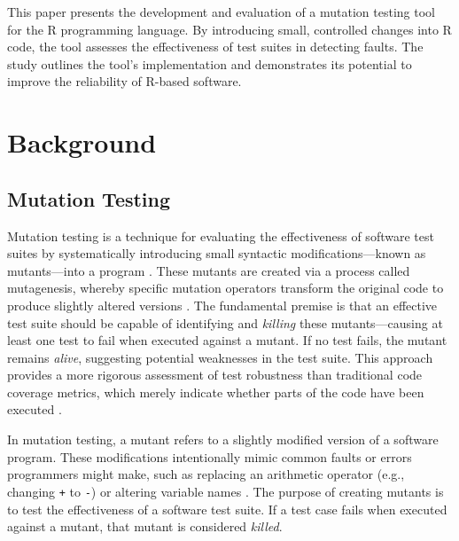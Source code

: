 This paper presents the development and evaluation of a mutation testing tool for the R programming language. By introducing small, controlled changes into R code, the tool assesses the effectiveness of test suites in detecting faults. The study outlines the tool’s implementation and demonstrates its potential to improve the reliability of R-based software.

\chapter{Background}

\begin{chapterabstract}
\end{chapterabstract}

\section{Mutation Testing}

Mutation testing is a technique for evaluating the effectiveness of software test suites by systematically introducing small syntactic modifications—known as mutants—into a program \cite{jia2011analysis}. These mutants are created via a process called mutagenesis, whereby specific mutation operators transform the original code to produce slightly altered versions \cite{offutt1996practical}. The fundamental premise is that an effective test suite should be capable of identifying and \textit{killing} these mutants—causing at least one test to fail when executed against a mutant. If no test fails, the mutant remains \textit{alive}, suggesting potential weaknesses in the test suite. This approach provides a more rigorous assessment of test robustness than traditional code coverage metrics, which merely indicate whether parts of the code have been executed \cite{petrovic2018industrial}.

In mutation testing, a mutant refers to a slightly modified version of a software program. These modifications intentionally mimic common faults or errors programmers might make, such as replacing an arithmetic operator (e.g., changing \texttt{+} to \texttt{-}) or altering variable names \cite{jia2011analysis}. The purpose of creating mutants is to test the effectiveness of a software test suite. If a test case fails when executed against a mutant, that mutant is considered \textit{killed}. 

